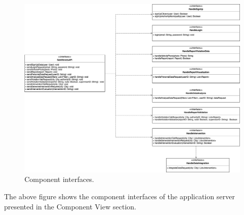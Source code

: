 \begin{figure}[H]
	\centering
	\includegraphics[width=\linewidth]{Images/ComponentInterfaces}
	\caption{Component interfaces.}
\end{figure}
The above figure shows the component interfaces of the application server presented in the Component View section. 